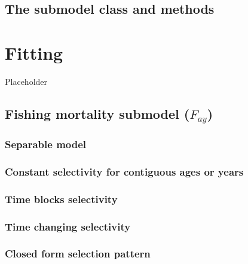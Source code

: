 \documentclass[
]{book}
\begin{document}
\hypertarget{the-submodel-class-and-methods}{%
\section{The submodel class and methods}\label{the-submodel-class-and-methods}}

\hypertarget{fitting}{%
\chapter{Fitting}\label{fitting}}

Placeholder

\hypertarget{fishing-mortality-submodel-f_ay}{%
\section{\texorpdfstring{Fishing mortality submodel (\(F_{ay}\))}{Fishing mortality submodel (F\_\{ay\})}}\label{fishing-mortality-submodel-f_ay}}

\hypertarget{separable-model}{%
\subsection{Separable model}\label{separable-model}}

\hypertarget{constant-selectivity-for-contiguous-ages-or-years}{%
\subsection{Constant selectivity for contiguous ages or years}\label{constant-selectivity-for-contiguous-ages-or-years}}

\hypertarget{time-blocks-selectivity}{%
\subsection{Time blocks selectivity}\label{time-blocks-selectivity}}

\hypertarget{time-changing-selectivity}{%
\subsection{Time changing selectivity}\label{time-changing-selectivity}}

\hypertarget{closed-form-selection-pattern}{%
\subsection{Closed form selection pattern}\label{closed-form-selection-pattern}}
\end{document}
